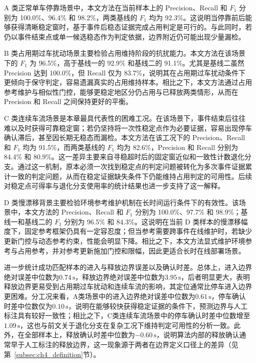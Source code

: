 \documentclass{xdupgthesis}
\begin{document}
A 类正常单车停靠场景中，本文方法在当前样本上的 Precision、Recall 和 $F_1$ 分别为 100.0\%、96.4\% 和 98.2\%，两类基线的 $F_1$ 均为 92.3\%。这说明当停靠前后能够获得清晰稳定窗时，基于事件后稳态证据完成占用判定是可行的。与此同时，若仍以事件结束点或单一候选稳态作为判定依据，边界附近仍可能出现少量漏检。

B 类占用期过车扰动场景主要检验占用维持阶段的抗扰能力。本文方法在该场景下的 $F_1$ 为 96.5\%，高于基线一的 92.9\% 和基线二的 91.1\%。尤其是基线二虽然 Precision 达到 100.0\%，但 Recall 仅为 83.7\%，说明其在占用期过车扰动条件下更倾向于保守判定，容易遗漏真实的占用维持样本。相比之下，本文方法通过占用参考维护与相似性门控，能够更稳定地区分仍占用与已释放两类情形，从而在 Precision 和 Recall 之间保持更好的平衡。

C 类连续车流场景是本章最具代表性的困难工况。在该场景下，事件结束后往往难以及时获得可靠稳定窗；若仍坚持将一次性稳定点作为必要证据，容易出现停车确认滞后，甚至因长期无稳态而漏检。本文方法在该工况下的 Precision、Recall 和 $F_1$ 均为 91.5\%，而两类基线的 $F_1$ 均为 82.6\%，Precision 和 Recall 分别为 84.4\% 和 80.9\%。这一差异主要来自寻稳超时后的固定窗近似和一致性计数退化分支。通过这一机制，原本必须一次找到稳定点的判定问题被转化为多次事件证据累计一致的判定问题，从而在稳定证据缺失条件下仍能维持占用判定的可用性。后续对稳定点可得率与退化分支使用率的统计结果也进一步支持了这一解释。

D 类慢漂移背景主要检验环境参考维护机制在长时间运行条件下的有效性。该场景中，本文方法的 Precision、Recall 和 $F_1$ 分别为 100.0\%、97.7\% 和 98.9\%；基线一和基线二的 $F_1$ 分别为 96.5\% 和 84.3\%。这说明在当前 D 类样本的慢漂移幅度下，固定参考框架仍具有一定容忍度；但当参考需要跨事件在线维护时，若缺少更新门控与动态参考约束，性能会明显下降。相比之下，本文方法显式维护环境参考与占用参考，并对参考更新施加门控和限幅，因此更适合长时在线部署场景。

进一步统计成功匹配样本的进入与释放边界误差以及确认时差。总体上，进入边界绝对误差中位数为$0.74\,\mathrm{s}$，释放边界绝对误差中位数为$3.95\,\mathrm{s}$，后者明显更大，表明释放边界更易受到占用期过车扰动和连续车流的影响，其定位通常比停车进入边界更困难。分工况来看，A类场景中的进入边界绝对误差中位数为$0.61\,\mathrm{s}$，停车确认时差中位数仅为$0.10\,\mathrm{s}$，说明在能够较快获得稳定证据的条件下，预测边界与人工标注具有较好一致性；相比之下，C类连续车流场景中的停车确认时差中位数增至$1.09\,\mathrm{s}$，这也与前文关于退化分支在复杂工况下维持判定可用性的分析一致。此外，在全部样本上，释放确认时差中位数为$-0.60\,\mathrm{s}$，说明算法内部的释放确认通常早于人工标注的释放边界，这一现象源于两者在边界定义口径上的差异（见第~\ref{subsec:ch4_definition}节）。
\end{document}
